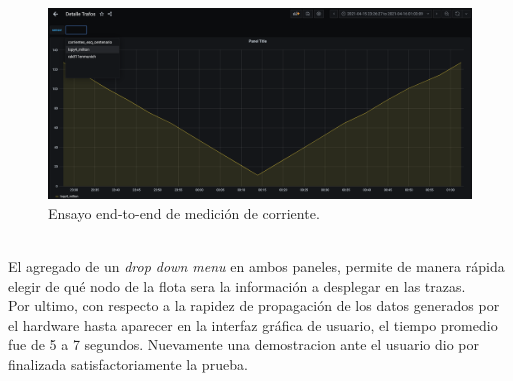 \begin{figure}[h]
	\centering
	\includegraphics[width=1.0\linewidth]{Figures/captura_historico_dropdown}
	\caption{Ensayo end-to-end de medici\'{o}n de corriente.}
	\label{fig:capturahistoricodropdown}
\end{figure}\\
El agregado de un \textit{drop down menu} en ambos paneles, permite de manera r\'{a}pida elegir de qu\'{e} nodo de la flota sera la informaci\'{o}n a desplegar en las trazas.\\
Por ultimo, con respecto a la rapidez de propagaci\'{o}n de los datos generados por el hardware hasta aparecer en la interfaz gráfica de usuario, el tiempo promedio fue de 5 a 7 segundos. Nuevamente una demostracion ante el usuario dio por finalizada satisfactoriamente la prueba.